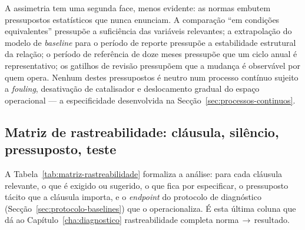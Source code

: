 A assimetria tem uma segunda face, menos evidente: as normas embutem pressupostos estatísticos que nunca enunciam. A comparação \enquote{em condições equivalentes} pressupõe a suficiência das variáveis relevantes; a extrapolação do modelo de \emph{baseline} para o período de reporte pressupõe a estabilidade estrutural da relação; o período de referência de doze meses pressupõe que um ciclo anual é representativo; os gatilhos de revisão pressupõem que a mudança é observável por quem opera. Nenhum destes pressupostos é neutro num processo contínuo sujeito a \emph{fouling}, desativação de catalisador e deslocamento gradual do espaço operacional --- a especificidade desenvolvida na Secção~\ref{sec:processos-continuos}.

\subsection{Matriz de rastreabilidade: cláusula, silêncio, pressuposto, teste}
\label{sec:assimetria-matriz}

A Tabela~\ref{tab:matriz-rastreabilidade} formaliza a análise: para cada cláusula relevante, o que é exigido ou sugerido, o que fica por especificar, o pressuposto tácito que a cláusula importa, e o \emph{endpoint} do protocolo de diagnóstico (Secção~\ref{sec:protocolo-baselines}) que o operacionaliza. É esta última coluna que dá ao Capítulo~\ref{cha:diagnostico} rastreabilidade completa norma\,$\to$\,resultado.

